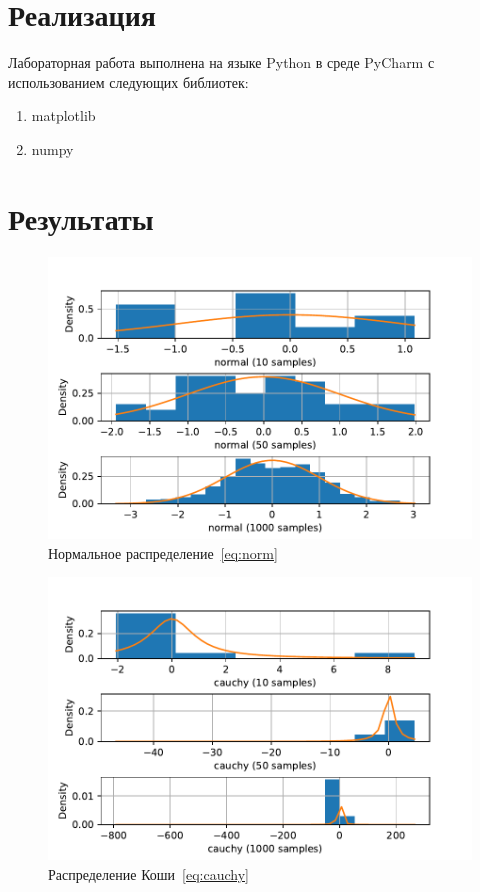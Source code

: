 \documentclass[a4paper]{article}
\begin{document}
    \section{Реализация}
        Лабораторная работа выполнена на языке Python в среде PyCharm с использованием следующих библиотек:
        \begin{enumerate}
            \item matplotlib
            \item numpy
        \end{enumerate}
        \section{Результаты}
        \begin{figure}[H]
            \centering
            \includegraphics[width = 16 cm]{src/normal}
            \caption{Нормальное распределение~\eqref{eq:norm}}
            \label{fig:norm}
        \end{figure}

        \begin{figure}[H]
            \centering
            \includegraphics[width = 16 cm]{src/cauchy}
            \caption{Распределение Коши~\eqref{eq:cauchy}}
            \label{fig:cauchy}
        \end{figure}
\end{document}

